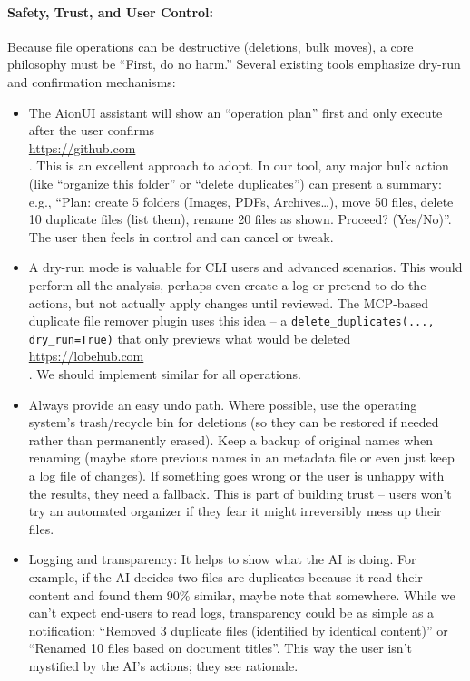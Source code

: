 \documentclass[11pt]{article}
\begin{document}
\paragraph{Safety, Trust, and User Control:} Because file operations can be destructive (deletions, bulk moves), a core philosophy must be “First, do no harm.” Several existing tools emphasize dry-run and confirmation mechanisms:
\begin{itemize}
  \item The AionUI assistant will show an “operation plan” first and only execute after the user confirms \\ \url{https://github.com} \\ . This is an excellent approach to adopt. In our tool, any major bulk action (like “organize this folder” or “delete duplicates”) can present a summary: e.g., “Plan: create 5 folders (Images, PDFs, Archives…), move 50 files, delete 10 duplicate files (list them), rename 20 files as shown. Proceed? (Yes/No)”. The user then feels in control and can cancel or tweak.
  \item A dry-run mode is valuable for CLI users and advanced scenarios. This would perform all the analysis, perhaps even create a log or pretend to do the actions, but not actually apply changes until reviewed. The MCP-based duplicate file remover plugin uses this idea -- a \texttt{delete\_duplicates(..., dry\_run=True)} that only previews what would be deleted \\ \url{https://lobehub.com} \\ . We should implement similar for all operations.
  \item Always provide an easy undo path. Where possible, use the operating system’s trash/recycle bin for deletions (so they can be restored if needed rather than permanently erased). Keep a backup of original names when renaming (maybe store previous names in an metadata file or even just keep a log file of changes). If something goes wrong or the user is unhappy with the results, they need a fallback. This is part of building trust -- users won’t try an automated organizer if they fear it might irreversibly mess up their files.
  \item Logging and transparency: It helps to show what the AI is doing. For example, if the AI decides two files are duplicates because it read their content and found them 90\% similar, maybe note that somewhere. While we can’t expect end-users to read logs, transparency could be as simple as a notification: “Removed 3 duplicate files (identified by identical content)” or “Renamed 10 files based on document titles”. This way the user isn’t mystified by the AI’s actions; they see rationale.
\end{itemize}
\end{document}
